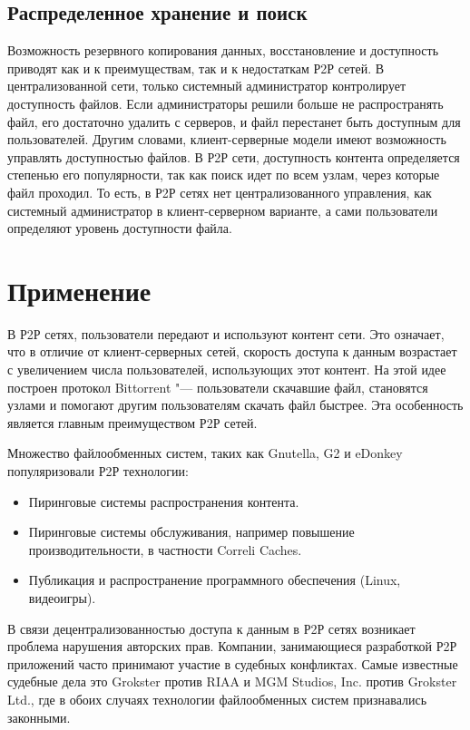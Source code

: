 \documentclass[bachelor, och, coursework]{SCWorks}
\begin{document}
\subsection{Распределенное хранение и поиск}
Возможность резервного копирования данных, восстановление и доступность приводят как и к преимуществам, так и к недостаткам Р2Р сетей. 
В централизованной сети, только системный администратор контролирует доступность файлов. 
Если администраторы решили больше не распространять файл, его достаточно удалить с серверов,
и файл перестанет быть доступным для пользователей. Другим словами, клиент-серверные модели имеют возможность управлять доступностью файлов. 
В Р2Р сети, доступность контента определяется степенью его популярности, так как поиск идет по всем узлам, через которые файл проходил. 
То есть, в Р2Р сетях нет централизованного управления, как системный администратор в клиент-серверном варианте, 
а сами пользователи определяют уровень доступности файла.

\section{Применение}
В Р2Р сетях, пользователи передают и используют контент сети. Это означает, что в отличие от клиент-серверных сетей, 
скорость доступа к данным возрастает с увеличением числа пользователей, использующих этот контент. 
На этой идее построен протокол Bittorrent "--- пользователи скачавшие файл, становятся узлами и помогают другим пользователям скачать файл быстрее. 
Эта особенность является главным преимуществом Р2Р сетей.

Множество файлообменных систем, таких как Gnutella, G2 и eDonkey популяризовали Р2Р технологии:
\begin{itemize}
    \item Пиринговые системы распространения контента.
    \item Пиринговые системы обслуживания, например повышение производительности, в частности Correli Caches.
    \item Публикация и распространение программного обеспечения (Linux, видеоигры).
\end{itemize}

В связи децентрализованностью доступа к данным в Р2Р сетях возникает проблема нарушения авторских прав. 
Компании, занимающиеся разработкой Р2Р приложений часто принимают участие в судебных конфликтах. 
Самые известные судебные дела это Grokster против RIAA и MGM Studios, Inc. против Grokster Ltd., 
где в обоих случаях технологии файлообменных систем признавались законными.
\end{document}
